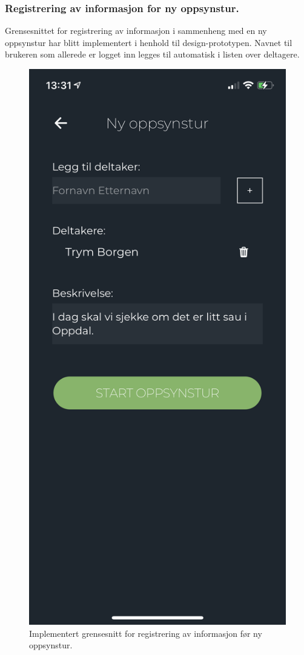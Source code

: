\subsubsection{Registrering av informasjon for ny oppsynstur.}
Grensesnittet for registrering av informasjon i sammenheng med en ny oppsynstur har blitt implementert i henhold til design-prototypen. Navnet til brukeren som allerede er logget inn legges til automatisk i listen over deltagere.
\begin{figure}[H]
\centering
\captionsetup{width=.8\linewidth}
\includegraphics[scale=0.4]{Figurer/skjermbilder/info-oppsynstur.png}
\caption{Implementert grensesnitt for registrering av informasjon før ny oppsynstur.}
\label{fig:info-oppsysntur}
\end{figure}

